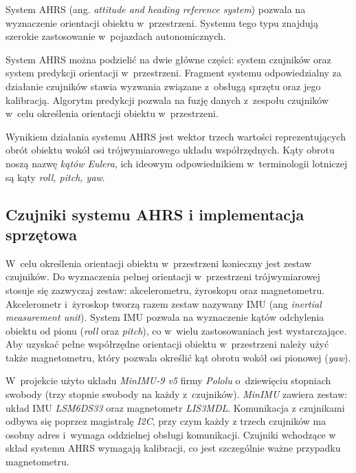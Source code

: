 System AHRS (ang. \textit{attitude and heading reference system}) pozwala na
wyznaczenie orientacji obiektu w~przestrzeni.
Systemu tego typu znajdują szerokie zastosowanie w~pojazdach autonomicznych.

System AHRS można podzielić na dwie główne części: system czujników oraz system
predykcji orientacji w~przestrzeni.
Fragment systemu odpowiedzialny za działanie czujników stawia wyzwania związane
z~obsługą sprzętu oraz jego kalibracją.
Algorytm predykcji pozwala na fuzję danych z~zespołu czujników w~celu
określenia orientacji obiektu w~przestrzeni.

Wynikiem działania systemu AHRS jest wektor trzech wartości reprezentujących
obrót obiektu wokół osi trójwymiarowego układu współrzędnych.
Kąty obrotu noszą nazwę \textit{kątów Eulera}, ich ideowym odpowiednikiem
w~terminologii lotniczej są kąty \textit{roll, pitch, yaw}.

\subsection{Czujniki systemu AHRS i implementacja sprzętowa}
W~celu określenia orientacji obiektu w~przestrzeni konieczny jest zestaw
czujników.
Do wyznaczenia pełnej orientacji w~przestrzeni trójwymiarowej stosuje się
zazwyczaj zestaw: akcelerometru, żyroskopu oraz magnetometru.
Akcelerometr i~żyroskop tworzą razem zestaw nazywany IMU (ang \textit{inertial
measurement unit}).
System IMU pozwala na wyznaczenie kątów odchylenia obiektu od pionu
(\textit{roll} oraz \textit{pitch}), co w~wielu zastosowaniach jest
wystarczające.
Aby uzyskać pełne współrzędne orientacji obiektu w~przestrzeni należy użyć
także magnetometru, który pozwala określić kąt obrotu wokół osi pionowej
(\textit{yaw}).

W~projekcie użyto układu \textit{MinIMU-9 v5} firmy \textit{Pololu}
o~dziewięciu stopniach swobody (trzy stopnie swobody na każdy z~czujników).
\textit{MinIMU} zawiera zestaw: układ IMU \textit{LSM6DS33} oraz magnetometr
\textit{LIS3MDL}.
Komunikacja z czujnikami odbywa się poprzez magistralę \textit{I2C}, przy czym
każdy z trzech czujników ma osobny adres i~wymaga oddzielnej obsługi
komunikacji.
Czujniki wchodzące w skład systemu AHRS wymagają kalibracji, co jest
szczególnie ważne przypadku magnetometru.

